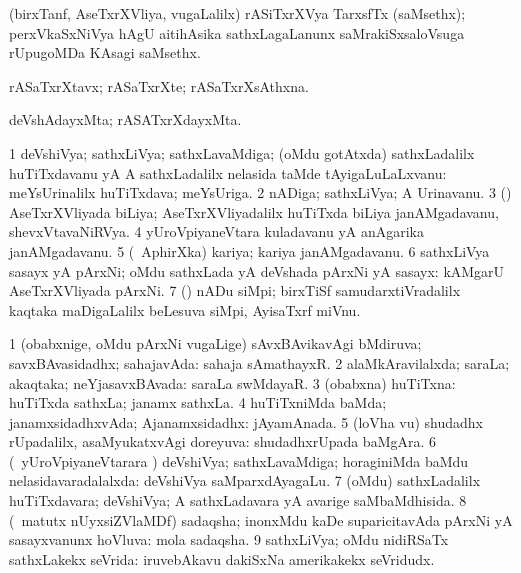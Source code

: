 \bentry
{}
\gl{\nA}
\bmng
(birxTanf, AseTxrXVliya, \mo vugaLalilx) rASiTxrXVya TarxsfTx (saMsethx); perxVkaSxNiVya hAgU aitihAsika sathxLagaLanunx saMrakiSxsaloVsuga rUpugoMDa KAsagi saMsethx. 
\emng
\eentry

\bentry
{}
\gl{\nA}
\bmng
rASaTxrXtavx; rASaTxrXte; rASaTxrXsAthxna. 
\emng
\eentry

\bentry
{}
\gl{\gu}
\bmng
deVshAdayxMta; rASATxrXdayxMta. 
\emng
\eentry

\bentry
{}
\gl{\nA}
\bmng
\bnum
\num{1} deVshiVya; sathxLiVya; sathxLavaMdiga; (oMdu gotAtxda) sathxLadalilx huTiTxdavanu yA A sathxLadalilx nelasida taMde tAyigaLuLaLxvanu:  meYsUrinalilx huTiTxdava; meYsUriga. 
\num{2} nADiga; sathxLiVya; A Urinavanu. 
\num{3} (\AseTxrXV) AseTxrXVliyada biLiya; AseTxrXVliyadalilx huTiTxda biLiya janAMgadavanu, shevxVtavaNiRVya. 
\num{4} yUroVpiyaneVtara kuladavanu yA anAgarika janAMgadavanu. 
\num{5} (\da\ AphirXka) kariya; kariya janAMgadavanu. 
\num{6} sathxLiVya sasayx yA pArxNi; oMdu sathxLada yA deVshada pArxNi yA sasayx:  kAMgarU AseTxrXVliyada pArxNi. 
\num{7} (\pArxvi) nADu siMpi; birxTiSf samudarxtiVradalilx kaqtaka maDigaLalilx beLesuva siMpi, AyisaTxrf miVnu. 
\enum
\emng
\eentry

\bentry
{}
\gl{\gu}
\bmng
\bnum
\num{1} (obabxnige, oMdu pArxNi \mo vugaLige) sAvxBAvikavAgi bMdiruva; savxBAvasidadhx; sahajavAda:  sahaja sAmathayxR. 
\num{2} alaMkAravilalxda; saraLa; akaqtaka; neYjasavxBAvada:  saraLa swMdayaR. 
\num{3} (obabxna) huTiTxna:  huTiTxda sathxLa; janamx sathxLa. 
\num{4} huTiTxniMda baMda; janamxsidadhxvAda; Ajanamxsidadhx: jAyamAnada. 
\num{5} (loVha \mo vu) shudadhx rUpadalilx, asaMyukatxvAgi doreyuva:  shudadhxrUpada baMgAra. 
\num{6} (\kanmu\ yUroVpiyaneVtarara \vi) deVshiVya; sathxLavaMdiga; horaginiMda baMdu nelasidavaradalalxda:  deVshiVya saMparxdAyagaLu. 
\num{7} (oMdu) sathxLadalilx huTiTxdavara; deVshiVya; A sathxLadavara yA avarige saMbaMdhisida. 
\num{8} (\AseTxrXV\ matutx nUyxsiZVlaMDf) sadaqsha; inonxMdu kaDe suparicitavAda pArxNi yA sasayxvanunx hoVluva:  mola sadaqsha. 
\num{9} sathxLiVya; oMdu nidiRSaTx sathxLakekx seVrida:  iruvebAkavu dakiSxNa amerikakekx seVridudx. 
\enum
\emng

